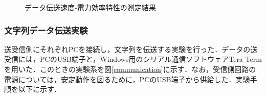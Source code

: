 \begin{figure}[h]
\begin{center}

     \caption{データ伝送速度-電力効率特性の測定結果}\label{datavseta} 
  \end{center}
\end{figure}


\subsubsection{文字列データ伝送実験}
送受信側にそれぞれPCを接続し，文字列を伝送する実験を行った．データの送受信には，PCのUSB端子と，Windows用のシリアル通信ソフトウェアTera Termを用いた．このときの実験系を図\ref{communication}に示す．なお，受信側回路の電源については，安定動作を図るために，PCのUSB端子から供給した．実験手順を以下に示す．

